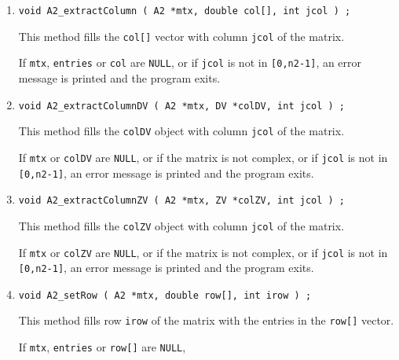 \begin{enumerate}
or if {\tt irow} is not in {\tt [0,n1-1]},
an error message is printed and the program exits.
\item
\begin{verbatim}
void A2_extractColumn ( A2 *mtx, double col[], int jcol ) ;
\end{verbatim}
This method fills the {\tt col[]} vector 
with column {\tt jcol} of the matrix.
\par {}
If {\tt mtx}, {\tt entries} or {\tt col} are {\tt NULL},
or if {\tt jcol} is not in {\tt [0,n2-1]},
an error message is printed and the program exits.
\item
\begin{verbatim}
void A2_extractColumnDV ( A2 *mtx, DV *colDV, int jcol ) ;
\end{verbatim}
This method fills the {\tt colDV} object 
with column {\tt jcol} of the matrix.
\par {}
If {\tt mtx} or {\tt colDV} are {\tt NULL},
or if the matrix is not complex,
or if {\tt jcol} is not in {\tt [0,n2-1]},
an error message is printed and the program exits.
\item
\begin{verbatim}
void A2_extractColumnZV ( A2 *mtx, ZV *colZV, int jcol ) ;
\end{verbatim}
This method fills the {\tt colZV} object 
with column {\tt jcol} of the matrix.
\par {}
If {\tt mtx} or {\tt colZV} are {\tt NULL},
or if the matrix is not complex,
or if {\tt jcol} is not in {\tt [0,n2-1]},
an error message is printed and the program exits.
\item
\begin{verbatim}
void A2_setRow ( A2 *mtx, double row[], int irow ) ;
\end{verbatim}
This method fills row {\tt irow} of the matrix 
with the entries in the {\tt row[]} vector.
\par {}
If {\tt mtx}, {\tt entries} or {\tt row[]} are {\tt NULL},

\end{enumerate}
